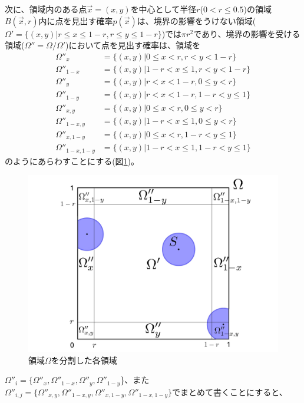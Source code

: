 次に、領域内のある点$\vec x=(x,y)$を中心として半径$r$($0 < r \le 0.5$)の領域$B(\vec x, r)$内に点を見出す確率$p(\vec x)$は、境界の影響をうけない領域($\Omega ' = \{(x,y) | r \le x \le 1-r, r \le y \le 1-r \}$)では$\pi r^{2}$であり、境界の影響を受ける領域($\Omega'' = \Omega / \Omega'$)において点を見出す確率は、領域を
\begin{align}
\Omega''_{x} &= \{(x,y) | 0 \le x < r, r< y < 1-r\}\nonumber \\
\Omega''_{1-x} &= \{(x,y) | 1-r < x \le 1, r< y < 1-r\}\nonumber \\
\Omega''_{y} &= \{(x,y) | r < x < 1-r, 0 \le y < r\}\nonumber \\
\Omega''_{1-y} &= \{(x,y) | r < x < 1-r, 1-r < y \le 1\}\nonumber \\
\Omega''_{x,y} &= \{(x,y) | 0 \le x < r, 0 \le y < r\}\nonumber \\
\Omega''_{1-x,y} &= \{(x,y) | 1-r < x \le 1, 0 \le y < r\}\nonumber \\
\Omega''_{x,1-y} &= \{(x,y) | 0 \le x < r, 1-r < y \le 1\}\nonumber \\
\Omega''_{1-x, 1-y} &= \{(x,y) | 1-r < x \le 1, 1-r < y \le 1\}\nonumber
\end{align}
のようにあらわすことにする(図\ref{fig:f20})。
\begin{figure}[H]
    \begin{center}
        \includegraphics[width=12.5cm]{../img/omega.jpg}
        \caption{領域$\Omega$を分割した各領域}
        \label{fig:f20}
    \end{center}
\end{figure}
$\Omega''_{i} = \{\Omega''_{x}, \Omega''_{1-x}, \Omega''_{y}, \Omega''_{1-y}$\}、また$\Omega''_{i,j} = \{\Omega''_{x,y}, \Omega''_{1-x,y}, \Omega''_{x,1-y}, \Omega''_{1-x,1-y}\}$でまとめて書くことにすると、
